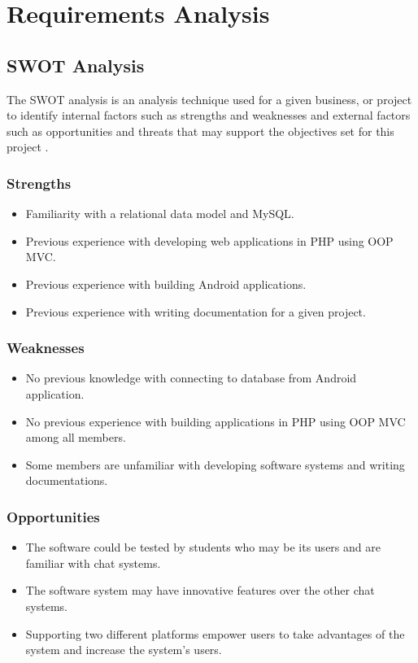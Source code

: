 \documentclass{article}
\begin{document}
\newpage
\section{Requirements Analysis}
\subsection{SWOT Analysis}
The SWOT analysis is an analysis technique used for a given business, or project to identify internal factors such as strengths and weaknesses and external factors such as opportunities and threats that may support the objectives set for this project \cite{SWOT}. \par
\subsubsection{Strengths}
\begin{itemize}
\item Familiarity with a relational data model and MySQL. 
\item Previous experience with developing web applications in PHP using OOP MVC. 
\item Previous experience with building Android applications. 
\item Previous experience with writing documentation for a given project. 
\end{itemize}
\subsubsection{Weaknesses}
\begin{itemize}
\item No previous knowledge with connecting to database from Android application. 
\item No previous experience with building applications in PHP using OOP MVC among all members. 
\item Some members are unfamiliar with developing software systems and writing documentations. 
\end{itemize}
\subsubsection{Opportunities}
\begin{itemize}
\item The software could be tested by students who may be its users and are familiar with chat systems. 
\item The software system may have innovative features over the other chat systems. 
\item Supporting two different platforms empower users to take advantages of the system and increase the system's users. 
\end{itemize}
\end{document}
